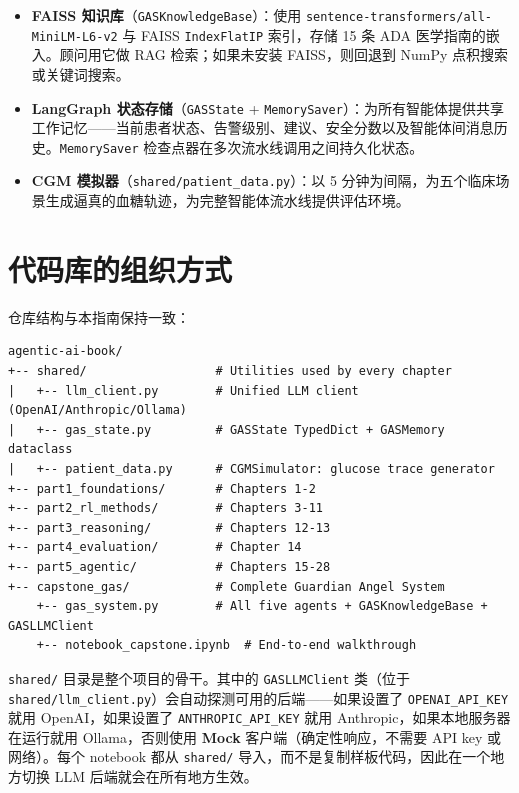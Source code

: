 \documentclass[11pt,a4paper,openany]{book}
\begin{document}
\begin{itemize}
  \item \textbf{FAISS 知识库}（\texttt{GASKnowledgeBase}）：使用 \texttt{sentence-transformers/all-MiniLM-L6-v2} 与 FAISS \texttt{IndexFlatIP} 索引，存储 15 条 ADA 医学指南的嵌入。顾问用它做 RAG 检索；如果未安装 FAISS，则回退到 NumPy 点积搜索或关键词搜索。
  \item \textbf{LangGraph 状态存储}（\texttt{GASState} + \texttt{MemorySaver}）：为所有智能体提供共享工作记忆——当前患者状态、告警级别、建议、安全分数以及智能体间消息历史。\texttt{MemorySaver} 检查点器在多次流水线调用之间持久化状态。
  \item \textbf{CGM 模拟器}（\texttt{shared/patient\_data.py}）：以 5 分钟为间隔，为五个临床场景生成逼真的血糖轨迹，为完整智能体流水线提供评估环境。
\end{itemize}

\section*{代码库的组织方式}
\label{gas-codebase}

仓库结构与本指南保持一致：

\begin{verbatim}
agentic-ai-book/
+-- shared/                  # Utilities used by every chapter
|   +-- llm_client.py        # Unified LLM client (OpenAI/Anthropic/Ollama)
|   +-- gas_state.py         # GASState TypedDict + GASMemory dataclass
|   +-- patient_data.py      # CGMSimulator: glucose trace generator
+-- part1_foundations/       # Chapters 1-2
+-- part2_rl_methods/        # Chapters 3-11
+-- part3_reasoning/         # Chapters 12-13
+-- part4_evaluation/        # Chapter 14
+-- part5_agentic/           # Chapters 15-28
+-- capstone_gas/            # Complete Guardian Angel System
    +-- gas_system.py        # All five agents + GASKnowledgeBase + GASLLMClient
    +-- notebook_capstone.ipynb  # End-to-end walkthrough
\end{verbatim}

\texttt{shared/} 目录是整个项目的骨干。其中的 \texttt{GASLLMClient} 类（位于 \texttt{shared/llm\_client.py}）会自动探测可用的后端——如果设置了 \texttt{OPENAI\_API\_KEY} 就用 OpenAI，如果设置了 \texttt{ANTHROPIC\_API\_KEY} 就用 Anthropic，如果本地服务器在运行就用 Ollama，否则使用 \textbf{Mock} 客户端（确定性响应，不需要 API key 或网络）。每个 notebook 都从 \texttt{shared/} 导入，而不是复制样板代码，因此在一个地方切换 LLM 后端就会在所有地方生效。
\end{document}
